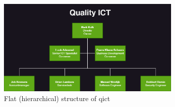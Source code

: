 \begin{figure}[htbp]
      \centering
      \includegraphics[width=0.8\textwidth]{Figures/OrganizationalDiagram_QICT.png}
      \caption{Flat (hierarchical) structure of \acrshort{qict}}
\end{figure}

